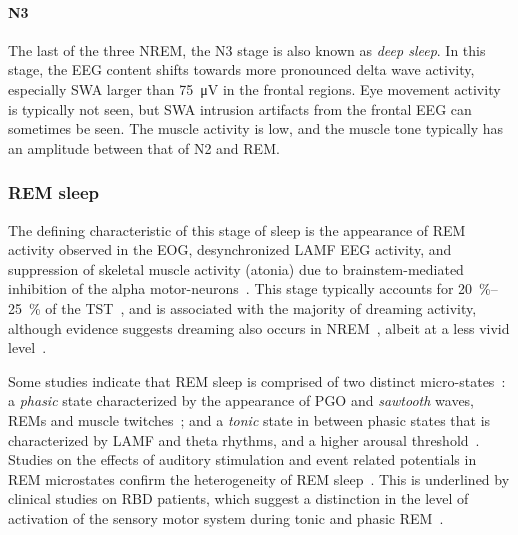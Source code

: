             \paragraph{N3} The last of the three \ac{NREM}, the \ac{N3} stage is also known as \textit{deep sleep}.
            In this stage, the \ac{EEG} content shifts towards more pronounced delta wave activity, especially \ac{SWA} larger than \SI{75}{\micro\volt} in the frontal regions.
            Eye movement activity is typically not seen, but \ac{SWA} intrusion artifacts from the frontal \ac{EEG} can sometimes be seen.
            The muscle activity is low, and the muscle tone typically has an amplitude between that of \ac{N2} and \ac{REM}.
            
            \subsubsection{REM sleep}
            The defining characteristic of this stage of sleep is the appearance of \ac{REM} activity observed in the \ac{EOG}, desynchronized \ac{LAMF} \ac{EEG} activity, and suppression of skeletal muscle activity (atonia) due to brainstem-mediated inhibition of the alpha motor-neurons~\cite{Carskadon2011,Simor2020}.    
            This stage typically accounts for \SIrange{20}{25}{\percent} of the \ac{TST}~\cite{Carskadon2011}, and is associated with the majority of dreaming activity, although evidence suggests dreaming also occurs in \ac{NREM}~\cite{Foulkes1962, Hobson2009, McNamara2010, Brown2012, Simor2020}, albeit at a less vivid level~\cite{Siclari2017}.
            
            Some studies indicate that \ac{REM} sleep is comprised of two distinct micro-states~\cite{Simor2020}: a \emph{phasic} state characterized by the appearance of \ac{PGO} and \emph{sawtooth} waves, \acp{REM} and muscle twitches~\cite{Takahara2009}; and a \emph{tonic} state in between phasic states that is characterized by \ac{LAMF} and theta rhythms, and a higher arousal threshold~\cite{Ermis2010}.
            Studies on the effects of auditory stimulation and event related potentials in \ac{REM} microstates confirm the heterogeneity of \ac{REM} sleep~\cite{Sallinen1996,Takahara2002,Takahara2006}. This is underlined by clinical studies on \ac{RBD} patients, which suggest a distinction in the level of activation of the sensory motor system during tonic and phasic \ac{REM}~\cite{Manni2009,DeCarli2016,Sunwoo2019}.
            
